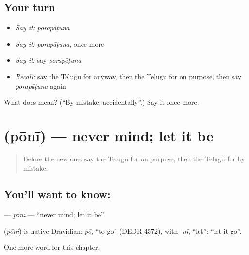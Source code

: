 \subsection*{Your turn}
\begin{itemize}
\raggedright
  \item \emph{Say it:} \emph{porapāṭuna}
  \item \emph{Say it:} \emph{porapāṭuna}, once more
  \item \emph{Say it:} say \emph{porapāṭuna}
  \item \emph{Recall:} say the Telugu for anyway, then the Telugu for on purpose, then say \emph{porapāṭuna} again
\end{itemize}

\begin{tcolorbox}[breakable,colback=teal!4,colframe=teal!35!black,title={Before you move on}]
What does  mean? (\textquotedblleft{}By mistake, accidentally\textquotedblright{}.) Say it once more.
\end{tcolorbox}
\section[\texorpdfstring{\te{పోనీ} (pōnī)}{పోనీ (pōnī)}]{ (pōnī) — never mind; let it be}

\label{lesson:TE-C178-poni}



\begin{quote}
Before the new one: say the Telugu for on purpose, then the Telugu for by mistake.
\end{quote}

\subsection*{You'll want to know: }
\textbf{} — \emph{pōnī} — \textquotedblleft{}never mind; let it be\textquotedblright{}.

\begin{cousinweb}
\textbf{} (\emph{pōnī}) is native Dravidian: \emph{pō}, \textquotedblleft{}to go\textquotedblright{} (DEDR 4572), with \emph{-nī}, \textquotedblleft{}let\textquotedblright{}: \textquotedblleft{}let it go\textquotedblright{}.
\end{cousinweb}

\begin{grammarlens}[title={What you've built}]
One more word for this chapter.
\end{grammarlens}

